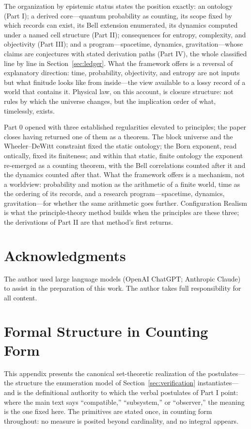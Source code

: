 \documentclass[11pt]{article}
\theoremstyle{definition}
\theoremstyle{remark}
\begin{document}
The organization by epistemic status states the position exactly: an ontology (Part I); a derived core---quantum probability as counting, its scope fixed by which records can exist, its Bell extension enumerated, its dynamics computed under a named cell structure (Part II); consequences for entropy, complexity, and objectivity (Part III); and a program---spacetime, dynamics, gravitation---whose claims are conjectures with stated derivation paths (Part IV), the whole classified line by line in Section~\ref{sec:ledger}. What the framework offers is a reversal of explanatory direction: time, probability, objectivity, and entropy are not inputs but what finitude looks like from inside---the view available to a lossy record of a world that contains it. Physical law, on this account, is closure structure: not rules by which the universe changes, but the implication order of what, timelessly, exists.

Part 0 opened with three established regularities elevated to principles; the paper closes having returned one of them as a theorem. The block universe and the Wheeler--DeWitt constraint fixed the static ontology; the Born exponent, read ontically, fixed its finiteness; and within that static, finite ontology the exponent re-emerged as a counting theorem, with the Bell correlations counted after it and the dynamics counted after that. What the framework offers is a mechanism, not a worldview: probability and motion as the arithmetic of a finite world, time as the ordering of its records, and a research program---spacetime, dynamics, gravitation---for whether the same arithmetic goes further. Configuration Realism is what the principle-theory method builds when the principles are these three; the derivations of Part II are that method's first returns.

\section*{Acknowledgments}
The author used large language models (OpenAI ChatGPT; Anthropic Claude) to assist in the preparation of this work. The author takes full responsibility for all content.

\appendix
\section{Formal Structure in Counting Form}\label{app:formal}
This appendix presents the canonical set-theoretic realization of the postulates---the structure the enumeration model of Section~\ref{sec:verification} instantiates---and is the definitional authority to which the verbal postulates of Part I point: where the main text says ``compatible,'' ``subsystem,'' or ``observer,'' the meaning is the one fixed here. The primitives are stated once, in counting form throughout: no measure is posited beyond cardinality, and no integral appears.
\end{document}
